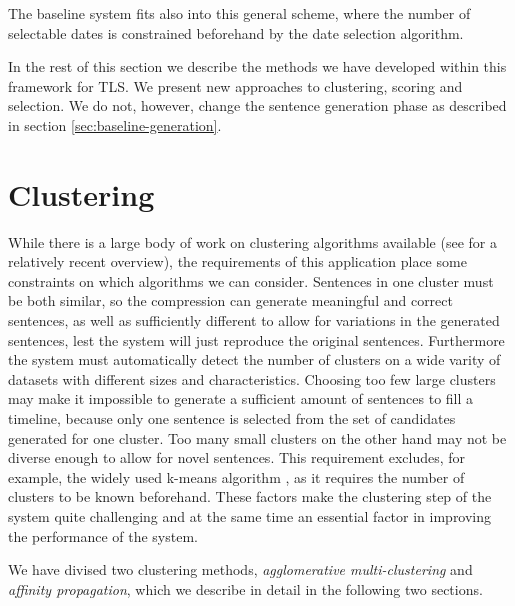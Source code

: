 \documentclass[a4paper,BCOR=10mm]{report}
\numberwithin{lemma}{chapter}
\numberwithin{definition}{chapter}
\begin{document}
The baseline system fits also into this general scheme, where the number of selectable dates is constrained beforehand by the date selection algorithm.

In the rest of this section we describe the methods we have developed within this framework for TLS. We present new approaches to clustering, scoring and selection. We do not, however, change the sentence generation phase as described in section \ref{sec:baseline-generation}.

\section{Clustering}

While there is a large body of work on clustering algorithms available (see \citet{xu} for a relatively recent overview), the requirements of this application place some constraints on which algorithms we can consider. Sentences in one cluster must be both similar, so the compression can generate meaningful and correct sentences, as well as sufficiently different to allow for variations in the generated sentences, lest the system will just reproduce the original sentences.
Furthermore the system must automatically detect the number of clusters on a wide varity of datasets with different sizes and characteristics.
Choosing too few large clusters may make it impossible to generate a sufficient amount of sentences to fill a timeline, because only one sentence is selected from the set of candidates generated for one cluster. Too many small clusters on the other hand may not be diverse enough to allow for novel sentences.
This requirement excludes, for example, the widely used k-means algorithm \citet{kmeans}, as it requires the number of clusters to be known beforehand.
These factors make the clustering step of the system quite challenging and at the same time an essential factor in improving the performance of the system.

We have divised two clustering methods, \textit{agglomerative multi-clustering} and \textit{affinity propagation}, which we describe in detail in the following two sections.
\end{document}
